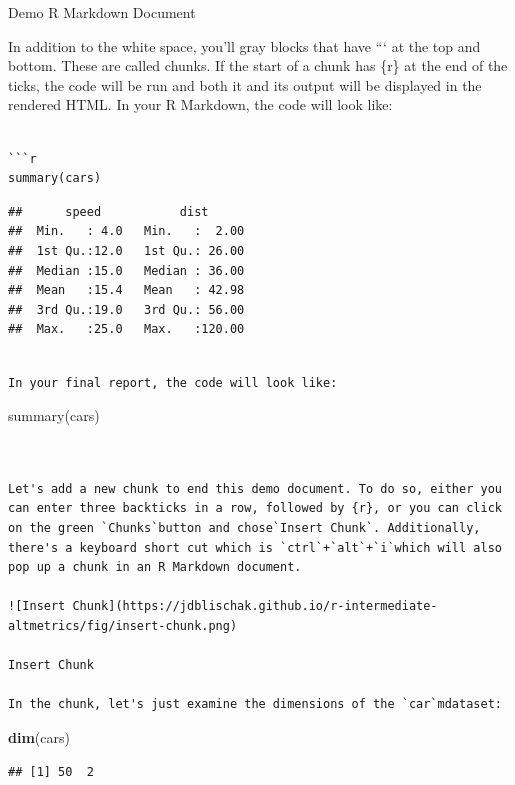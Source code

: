 \documentclass[
]{book}
\newenvironment{Shaded}{\begin{snugshade}}{\end{snugshade}}
\newcommand{\KeywordTok}[1]{\textcolor[rgb]{0.13,0.29,0.53}{\textbf{#1}}}
\newcommand{\NormalTok}[1]{#1}
\begin{document}
Demo R Markdown Document

In addition to the white space, you'll gray blocks that have ``` at the top and bottom. These are called chunks. If the start of a chunk has \{r\} at the end of the ticks, the code will be run and both it and its output will be displayed in the rendered HTML. In your R Markdown, the code will look like:

\begin{verbatim}

```r
summary(cars)
\end{verbatim}

\begin{verbatim}
##      speed           dist       
##  Min.   : 4.0   Min.   :  2.00  
##  1st Qu.:12.0   1st Qu.: 26.00  
##  Median :15.0   Median : 36.00  
##  Mean   :15.4   Mean   : 42.98  
##  3rd Qu.:19.0   3rd Qu.: 56.00  
##  Max.   :25.0   Max.   :120.00
\end{verbatim}

\begin{verbatim}

In your final report, the code will look like:
\end{verbatim}

summary(cars)

\begin{verbatim}


Let's add a new chunk to end this demo document. To do so, either you can enter three backticks in a row, followed by {r}, or you can click on the green `Chunks`button and chose`Insert Chunk`. Additionally, there's a keyboard short cut which is `ctrl`+`alt`+`i`which will also pop up a chunk in an R Markdown document.

![Insert Chunk](https://jdblischak.github.io/r-intermediate-altmetrics/fig/insert-chunk.png)

Insert Chunk

In the chunk, let's just examine the dimensions of the `car`mdataset:
\end{verbatim}

\begin{Shaded}
\begin{Highlighting}[]
\KeywordTok{dim}\NormalTok{(cars)}
\end{Highlighting}
\end{Shaded}

\begin{verbatim}
## [1] 50  2
\end{verbatim}
\end{document}
